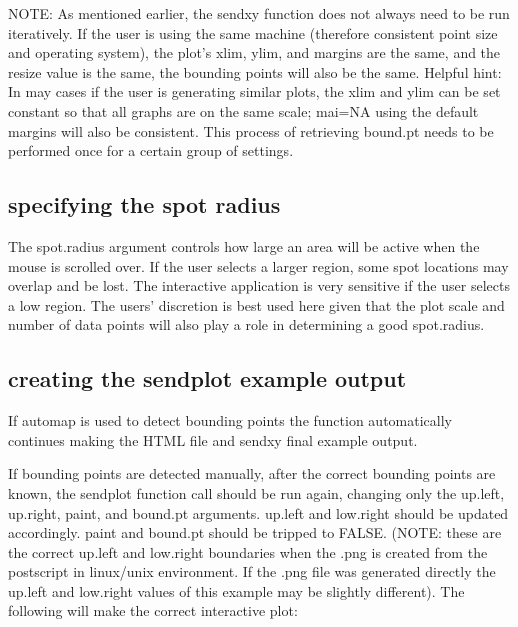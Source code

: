\documentclass[]{article}
\begin{document}
NOTE: As mentioned earlier, the sendxy function does not always need to be run iteratively. If the user is using the same machine (therefore consistent point size and operating system), the plot's xlim, ylim, and margins are the same, and the resize value is the same, the bounding points will also be the same. Helpful hint:  In may cases if the user is generating similar plots, the xlim and ylim can be set constant so that all graphs are on the same scale; mai=NA using the default margins will also be consistent. This process of retrieving bound.pt needs to be performed once for a certain group of settings.\newline
\\


\subsection{specifying the spot radius}

\indent The spot.radius argument controls how large an area will be active when the mouse is scrolled over. If the user selects a larger region, some spot locations may overlap and be lost. The interactive application is very sensitive if the user selects a low region. The users' discretion is best used here given that the plot scale and number of data points will also play a role in determining a good spot.radius.  \\


\subsection{creating the sendplot example output}

\indent If automap is used to detect bounding points the function automatically continues making the HTML file and sendxy final example output. 

\indent If bounding points are detected manually, after the correct bounding points are known, the sendplot function call should be run again, changing only the up.left, up.right, paint, and bound.pt arguments. up.left and low.right should be updated accordingly. paint and bound.pt should be tripped to FALSE. (NOTE: these are the correct up.left and low.right boundaries when the .png is created from the postscript in linux/unix environment. If the .png file was generated directly the up.left and low.right values of this example may be slightly different).  The following will make the correct interactive plot:
\end{document}
